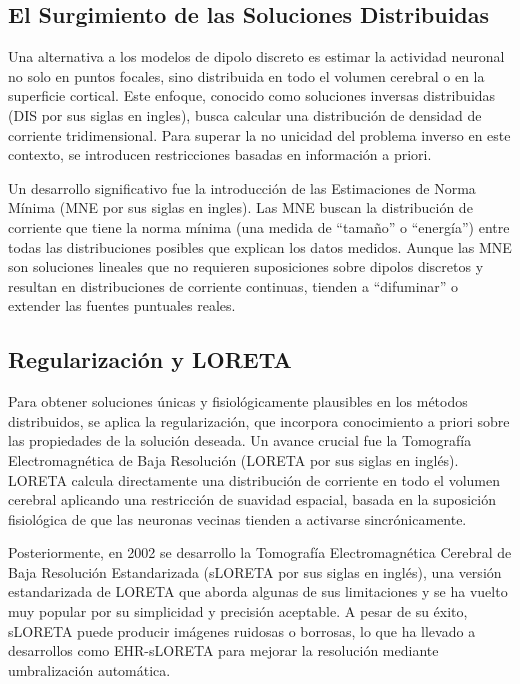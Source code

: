\subsection{El Surgimiento de las Soluciones Distribuidas}

Una alternativa a los modelos de dipolo discreto es estimar la actividad neuronal no solo en puntos focales, sino distribuida en todo el volumen cerebral o en la superficie cortical\cite{Michel2019}. Este enfoque, conocido como soluciones inversas distribuidas (DIS por sus siglas en ingles), busca calcular una distribución de densidad de corriente tridimensional. Para superar la no unicidad del problema inverso en este contexto, se introducen restricciones basadas en información a priori.

Un desarrollo significativo fue la introducción de las Estimaciones de Norma Mínima (MNE por sus siglas en ingles)\cite{Hamalainen1994}. Las MNE buscan la distribución de corriente que tiene la norma mínima (una medida de ``tamaño'' o ``energía'') entre todas las distribuciones posibles que explican los datos medidos. Aunque las MNE son soluciones lineales que no requieren suposiciones sobre dipolos discretos y resultan en distribuciones de corriente continuas, tienden a ``difuminar'' o extender las fuentes puntuales reales\cite{ValdesSosa2000}.

\subsection{Regularización y LORETA}

Para obtener soluciones únicas y fisiológicamente plausibles en los métodos distribuidos, se aplica la regularización, que incorpora conocimiento a priori sobre las propiedades de la solución deseada\cite{Michel2019}. Un avance crucial fue la Tomografía Electromagnética de Baja Resolución (LORETA por sus siglas en inglés)\cite{PascualMarqui1994}. LORETA calcula directamente una distribución de corriente en todo el volumen cerebral aplicando una restricción de suavidad espacial, basada en la suposición fisiológica de que las neuronas vecinas tienden a activarse sincrónicamente.

Posteriormente, en 2002 se desarrollo la Tomografía Electromagnética Cerebral de Baja Resolución Estandarizada (sLORETA por sus siglas en inglés)\cite{PascualMarqui2002}, una versión estandarizada de LORETA que aborda algunas de sus limitaciones y se ha vuelto muy popular por su simplicidad y precisión aceptable\cite{Pantazis2021}. A pesar de su éxito, sLORETA puede producir imágenes ruidosas o borrosas, lo que ha llevado a desarrollos como EHR-sLORETA para mejorar la resolución mediante umbralización automática.

